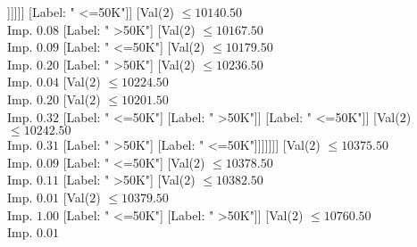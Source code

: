\documentclass[margin=10pt]{standalone}
\begin{document}
\begin{forest}
																																															[Label: " >50K"]
																																															[Val($2$) $ \leq 10074.50$ \\ Imp. $0.25$
																																																[Label: " <=50K"]
																																																[Label: " >50K"]]]]]]
																																											[Label: " <=50K"]]
																																										[Val($2$) $ \leq 10140.50$ \\ Imp. $0.08$
																																											[Label: " >50K"]
																																											[Val($2$) $ \leq 10167.50$ \\ Imp. $0.09$
																																												[Label: " <=50K"]
																																												[Val($2$) $ \leq 10179.50$ \\ Imp. $0.20$
																																													[Label: " >50K"]
																																													[Val($2$) $ \leq 10236.50$ \\ Imp. $0.04$
																																														[Val($2$) $ \leq 10224.50$ \\ Imp. $0.20$
																																															[Val($2$) $ \leq 10201.50$ \\ Imp. $0.32$
																																																[Label: " <=50K"]
																																																[Label: " >50K"]]
																																															[Label: " <=50K"]]
																																														[Val($2$) $ \leq 10242.50$ \\ Imp. $0.31$
																																															[Label: " >50K"]
																																															[Label: " <=50K"]]]]]]]
																																									[Val($2$) $ \leq 10375.50$ \\ Imp. $0.09$
																																										[Label: " <=50K"]
																																										[Val($2$) $ \leq 10378.50$ \\ Imp. $0.11$
																																											[Label: " >50K"]
																																											[Val($2$) $ \leq 10382.50$ \\ Imp. $0.01$
																																												[Val($2$) $ \leq 10379.50$ \\ Imp. $1.00$
																																													[Label: " <=50K"]
																																													[Label: " >50K"]]
																																												[Val($2$) $ \leq 10760.50$ \\ Imp. $0.01$

\end{forest}
\end{document}
